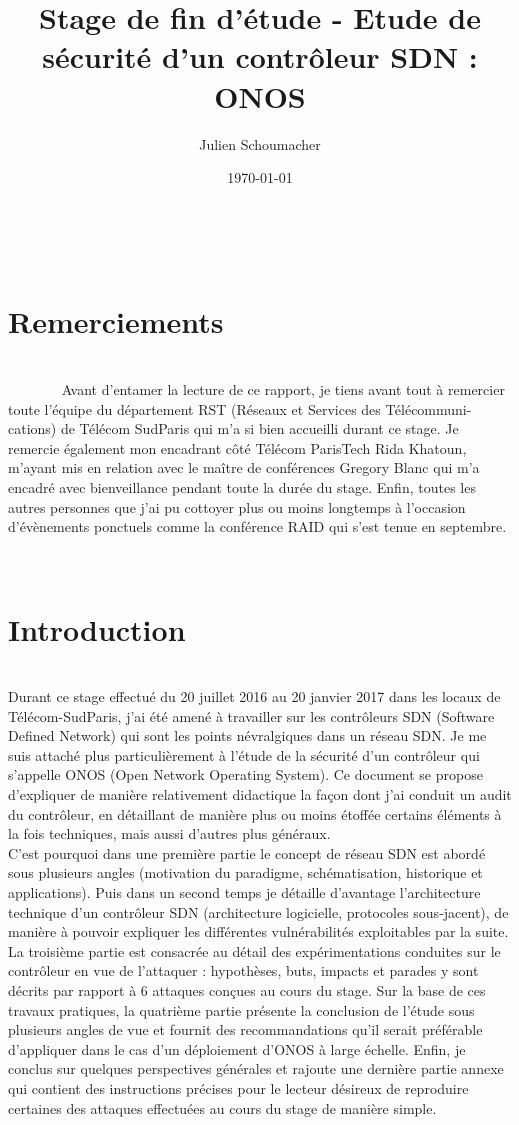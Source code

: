 \documentclass[11pt]{article}
\title{Stage de fin d'étude - Etude de sécurité d'un contrôleur SDN : ONOS}
\author{Julien Schoumacher}
\date{\today}
\begin{document}


\newpage
{\large ~\\}
\section*{\Huge{Remerciements}}
~\\
{\Large~~~~~~~
Avant d'entamer la lecture de ce rapport, je tiens avant tout à remercier toute l'équipe du département RST (Réseaux et Services des Télécommuni-cations) de Télécom SudParis qui m'a si bien accueilli durant ce stage. Je remercie également mon encadrant côté Télécom ParisTech Rida Khatoun, m'ayant mis en relation avec le maître de conférences Gregory Blanc qui m'a encadré avec bienveillance pendant toute la durée du stage. Enfin, toutes les autres personnes que j'ai pu cottoyer plus ou moins longtemps à l'occasion d'évènements ponctuels comme la conférence RAID qui s'est tenue en septembre.}

\newpage
{\large ~\\}
\section*{\Huge{Introduction}}
~\\
Durant ce stage effectué du 20 juillet 2016 au 20 janvier 2017 dans les locaux de Télécom-SudParis, j'ai été amené à travailler sur les contrôleurs SDN (Software Defined Network) qui sont les points névralgiques dans un réseau SDN. Je me suis attaché plus particulièrement à l'étude de la sécurité d'un contrôleur qui s'appelle ONOS (Open Network Operating System). Ce document se propose d'expliquer de manière relativement didactique la façon dont j'ai conduit un audit du contrôleur, en détaillant de manière plus ou moins étoffée certains éléments à la fois techniques, mais aussi d'autres plus généraux.\\
C'est pourquoi dans une première partie le concept de réseau SDN est abordé sous plusieurs angles (motivation du paradigme, schématisation, historique et applications).
Puis dans un second temps je détaille d'avantage l'architecture technique d'un contrôleur SDN (architecture logicielle, protocoles sous-jacent), de manière à pouvoir expliquer les différentes vulnérabilités exploitables par la suite.
La troisième partie est consacrée au détail des expérimentations conduites sur le contrôleur en vue de l'attaquer : hypothèses, buts, impacts et parades y sont décrits par rapport à 6 attaques conçues au cours du stage.
Sur la base de ces travaux pratiques, la quatrième partie présente la conclusion de l'étude sous plusieurs angles de vue et fournit des recommandations qu'il serait préférable d'appliquer dans le cas d'un déploiement d'ONOS à large échelle.
Enfin, je conclus sur quelques perspectives générales et rajoute une dernière partie annexe qui contient des instructions précises pour le lecteur désireux de reproduire certaines des attaques effectuées au cours du stage de manière simple.
\end{document}
